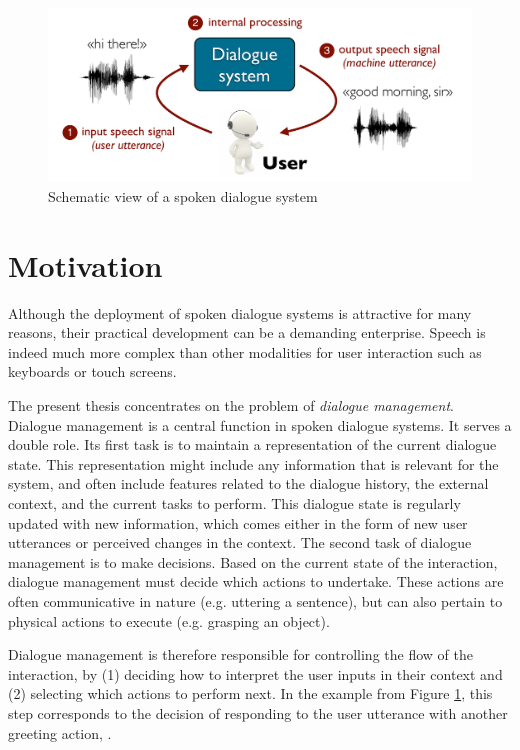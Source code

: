 \begin{figure}[h]
\center
\includegraphics[scale=0.45]{imgs/basicsds.pdf}
\caption{Schematic view of a spoken dialogue system}
\label{fig:basicsds}
\end{figure}

\section{Motivation}

Although the deployment of spoken dialogue systems is attractive for many reasons, their practical development can be a demanding enterprise. Speech is indeed much more complex than other modalities for user interaction such as keyboards or touch screens.  

The present thesis concentrates on the problem of \textit{dialogue management}.  Dialogue management is a central function in spoken dialogue systems.  It serves a double role. 
Its first task is to maintain a representation of the current dialogue state. This representation might include any information that is relevant for the system, and often include features related to the dialogue history, the external context, and the current tasks to perform.  This dialogue state is regularly updated with new information, which comes either in the form of new user utterances or perceived changes in the context. The second task of dialogue management is to make decisions.  Based on the current state of the interaction, dialogue management must decide which actions to undertake. These actions are often communicative in nature (e.g. uttering a sentence), but can also pertain to physical actions to execute (e.g. grasping an object).  

Dialogue management is therefore responsible for controlling the flow of the interaction, by (1) deciding how to interpret the user inputs in their context and (2) selecting which actions to perform next. In the example from Figure \ref{fig:basicsds}, this step corresponds to the decision of responding to the user utterance  with another greeting action, . 

